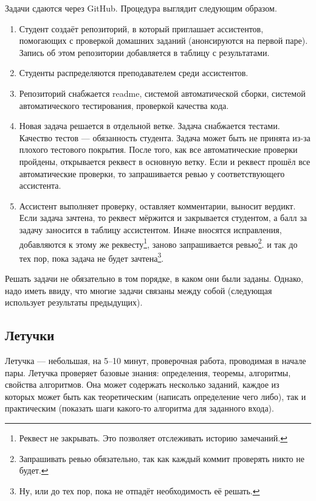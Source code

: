 Задачи сдаются через GitHub. Процедура выглядит следующим образом.
\begin{enumerate}
    \item Студент создаёт репозиторий, в который приглашает ассистентов, помогающих с проверкой домашних заданий (анонсируются на первой паре). Запись об этом репозитории добавляется в таблицу с результатами. 
    \item Студенты распределяются преподавателем среди ассистентов.
    \item Репозиторий снабжается readme, системой автоматической сборки, системой автоматического тестирования, проверкой качества кода. 
    \item Новая задача решается в отдельной ветке. Задача снабжается тестами. Качество тестов --- обязанность студента. Задача может быть не принята из-за плохого тестового покрытия. После того, как все автоматические проверки пройдены, открывается реквест в основную ветку. Если и реквест прошёл все автоматические проверки, то запрашивается ревью у соответствующего ассистента. 
    \item Ассистент выполняет проверку, оставляет комментарии, выносит вердикт. Если задача зачтена, то реквест мёржится и закрывается студентом, а балл за задачу заносится в таблицу ассистентом. Иначе вносятся исправления, добавляются к этому же реквесту\footnote{Реквест не закрывать. Это позволяет отслеживать историю замечаний.}, заново запрашивается ревью\footnote{Запрашивать ревью обязательно, так как каждый коммит проверять никто не будет.}. и так до тех пор, пока задача не будет зачтена\footnote{Ну, или до тех пор, пока не отпадёт необходимость её решать.}.
\end{enumerate}

Решать задачи не обязательно в том порядке, в каком они были заданы. Однако, надо иметь ввиду, что многие задачи связаны между собой (следующая использует результаты предыдущих).

\subsection{Летучки}

Летучка --- небольшая, на 5--10 минут, проверочная работа, проводимая в начале пары. 
Летучка проверяет базовые знания: определения, теоремы, алгоритмы, свойства алгоритмов. 
Она может содержать несколько заданий, каждое из которых может быть как теоретическим (написать определение чего либо), так и практическим (показать шаги какого-то алгоритма для заданного входа).

